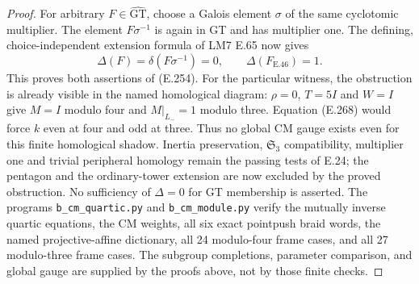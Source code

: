 \begin{proof}
For arbitrary $F\in\widehat{\mathrm{GT}}$, choose a
Galois element $\sigma$ of the same cyclotomic
multiplier.  The element $F\sigma^{-1}$ is again in
GT and has multiplier one.  The defining, choice-independent
extension formula of LM7 E.65 now gives
\[
 \Delta(F)=\delta(F\sigma^{-1})=0,
 \qquad \Delta(F_{\mathrm{E.46}})=1.
                                                               \tag{E.269}
\]
This proves both assertions of (E.254).
For the particular witness, the obstruction is already visible
in the named homological diagram: $\rho=0$, $T=5I$ and
$W=I$ give $M=I$ modulo four and $M|_{L_-}=1$ modulo
three.  Equation (E.268) would force $k$ even at four
and odd at three.  Thus no global CM gauge exists even
for this finite homological shadow.  Inertia preservation,
$\mathfrak S_3$ compatibility, multiplier one and trivial
peripheral homology remain the passing tests of E.24;
the pentagon and the ordinary-tower extension are now
excluded by the proved obstruction.  No sufficiency
of $\Delta=0$ for GT membership is asserted.
The programs \texttt{b\_cm\_quartic.py} and
\texttt{b\_cm\_module.py} verify the mutually inverse
quartic equations, the CM weights, all six exact
pointpush braid words, the named projective-affine
dictionary, all 24 modulo-four frame cases, and all
27 modulo-three frame cases.  The subgroup completions,
parameter comparison, and global gauge are supplied
by the proofs above, not by those finite checks.
\end{proof}
